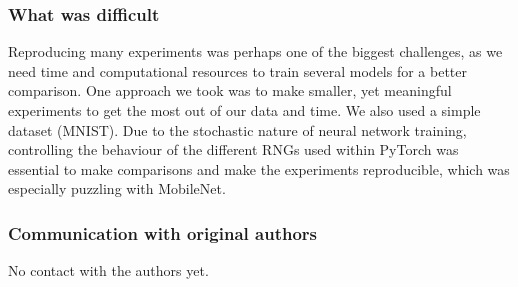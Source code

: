 \subsubsection*{What was difficult}

Reproducing many experiments was perhaps one of the biggest challenges, as we need time and computational resources to train several models for a better comparison. One approach we took was to make smaller, yet meaningful experiments to get the most out of our data and time. We also used a simple dataset (MNIST). Due to the stochastic nature of neural network training, controlling the behaviour of the different RNGs used within PyTorch was essential to make comparisons and make the experiments reproducible, which was especially puzzling with MobileNet.

\subsubsection*{Communication with original authors}

No contact with the authors yet.
